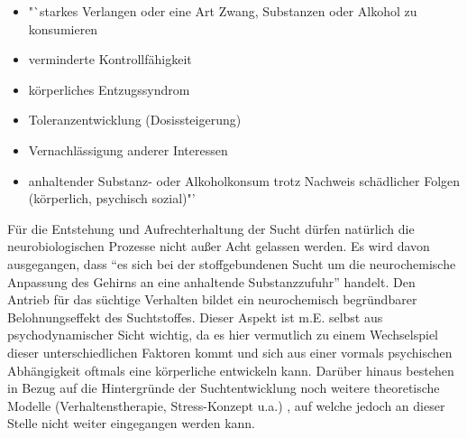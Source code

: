 \begin{itemize}
\item "`starkes Verlangen oder eine Art Zwang, Substanzen oder Alkohol zu konsumieren
\item verminderte Kontrollfähigkeit
\item körperliches Entzugssyndrom
\item Toleranzentwicklung (Dosissteigerung)
\item Vernachlässigung anderer Interessen
\item anhaltender Substanz- oder Alkoholkonsum trotz Nachweis schädlicher Folgen (körperlich, psychisch sozial)"' \autocite[315]{moeller2009}
\end{itemize}

Für die Entstehung und Aufrechterhaltung der Sucht dürfen natürlich die neurobiologischen Prozesse nicht außer Acht gelassen werden. Es wird davon ausgegangen, dass "`es sich bei der stoffgebundenen Sucht um die neurochemische Anpassung des Gehirns an eine anhaltende Substanzzufuhr"' \autocite[14]{tretter2008} handelt. Den Antrieb für das süchtige Verhalten bildet ein neurochemisch begründbarer Belohnungseffekt des Suchtstoffes. Dieser Aspekt ist m.E. selbst aus psychodynamischer Sicht wichtig, da es hier vermutlich zu einem Wechselspiel dieser unterschiedlichen Faktoren kommt und sich aus einer vormals psychischen Abhängigkeit oftmals eine körperliche entwickeln kann.
Darüber hinaus bestehen in Bezug auf die Hintergründe der Suchtentwicklung noch weitere theoretische Modelle (Verhaltenstherapie, Stress-Konzept u.a.) \autocite[vgl.][38ff.]{tretter2008}, auf welche jedoch an dieser Stelle nicht weiter eingegangen werden kann.
 
